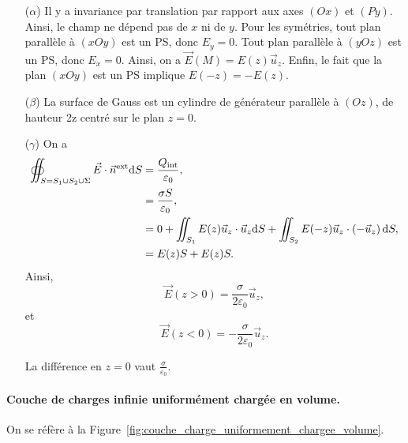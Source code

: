             \begin{itemize}
                \item [($\alpha$)] Il y a invariance par translation par rapport aux axes $(Ox)$ et $(Py)$. Ainsi, le champ ne dépend pas de $x$ ni de $y$. Pour les symétries, tout plan parallèle à $(xOy)$ est un PS, donc $E_y=0$. Tout plan parallèle à $(yOz)$ est un PS, donc $E_x=0$. Ainsi, on a $\vec{E}(M)=E(z)\vec{u}_z$.
                Enfin, le fait que la plan $(xOy)$ est un PS implique $E(-z)=-E(z)$.

                \item [($\beta$)] La surface de Gauss est un cylindre de générateur parallèle à $(Oz)$, de hauteur 2z centré sur le plan $z=0$.
                
                \item [($\gamma$)] On a 
                \begin{align}
                    \oiint_{S=S_1\cup S_2\cup \Sigma}\vec{E}\cdot\vec{n}^{\text{ext}}\mathrm{d} S
                    &=\frac{Q_{\text{int}}}{\varepsilon_0},\\
                    &=\frac{\sigma S}{\varepsilon_0},\\
                    &=0+\iint_{S_1}E(z)\vec{u}_z\cdot\vec{u}_z\mathrm{d} S+\iint_{S_2}E(-z)\vec{u}_z\cdot\left(-\vec{u}_z\right)\mathrm{d} S,\\
                    &=
                    E(z)S+E(z)S.
                \end{align}
                Ainsi, 
                \begin{equation}
                    \boxed{\vec{E}(z>0)=\frac{\sigma}{2\varepsilon_0}\vec{u}_z,}
                \end{equation}
                et 
                \begin{equation}
                    \boxed{\vec{E}(z<0)=-\frac{\sigma}{2\varepsilon_0}\vec{u}_z.}
                \end{equation}
                
                La différence en $z=0$ vaut $\frac{\sigma}{\varepsilon_0}$.
            \end{itemize}

            \paragraph{Couche de charges infinie uniformément chargée en volume.}

                On se réfère à la Figure~\ref{fig:couche_charge_uniformement_chargee_volume}.

